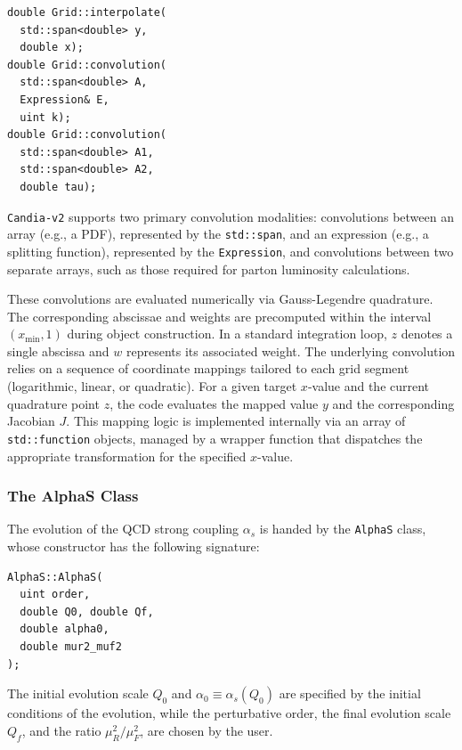 \documentclass[preprint,12pt]{elsarticle}
\begin{document}
\begin{verbatim}
double Grid::interpolate(
  std::span<double> y,
  double x);
double Grid::convolution(
  std::span<double> A,
  Expression& E,
  uint k);
double Grid::convolution(
  std::span<double> A1,
  std::span<double> A2,
  double tau);
\end{verbatim}

\texttt{Candia-v2} supports two primary convolution modalities: 
convolutions between an array (e.g., a PDF), represented by the \texttt{std::span}, and an expression (e.g., a splitting function), represented by the \texttt{Expression},
and convolutions between two separate arrays, such as those required for parton luminosity calculations.

These convolutions are evaluated numerically via Gauss-Legendre quadrature. 
The corresponding abscissae and weights are precomputed within the interval 
$(x_{\min}, 1)$ during object construction. In a standard integration loop, 
$z$ denotes a single abscissa and $w$ represents its associated weight. 
The underlying convolution relies on a sequence of coordinate mappings 
tailored to each grid segment (logarithmic, linear, or quadratic). 
For a given target $x$-value and the current quadrature point $z$, 
the code evaluates the mapped value $y$ and the corresponding 
Jacobian $J$. This mapping logic is implemented internally via an array 
of \texttt{std::function} objects, managed by a wrapper 
function that dispatches the appropriate transformation for the specified $x$-value.

\subsubsection{The AlphaS Class}
\label{subsec:alphas-class}

The evolution of the QCD strong coupling $\alpha_s$ is handed by the \texttt{AlphaS} class, whose constructor has the following signature:

\begin{verbatim}
AlphaS::AlphaS(
  uint order,
  double Q0, double Qf,
  double alpha0,
  double mur2_muf2
);
\end{verbatim}

The initial evolution scale $Q_0$ and $\alpha_0\equiv \alpha_s(Q_0)$ are specified by the initial conditions of the evolution, while the perturbative order, the final evolution scale $Q_f$, and the ratio $\mu_R^2/\mu_F^2$, are chosen by the user.
\end{document}
